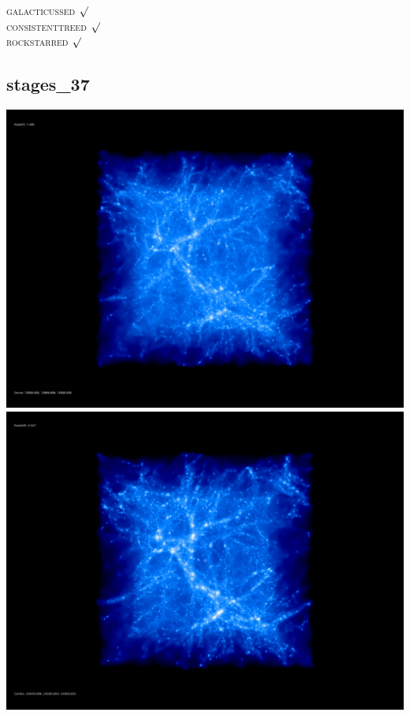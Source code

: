 \textsc{galacticussed} $\surd$ \\
\textsc{consistenttreed} $\surd$ \\ 
\textsc{rockstarred} $\surd$

% 
%
%
%
%
%
%
%


\newpage
\subsection{stages\_37}

\includegraphics[scale=0.1]{stages_37/50.jpg} 
\includegraphics[scale=0.1]{stages_37/100.jpg}  \\

